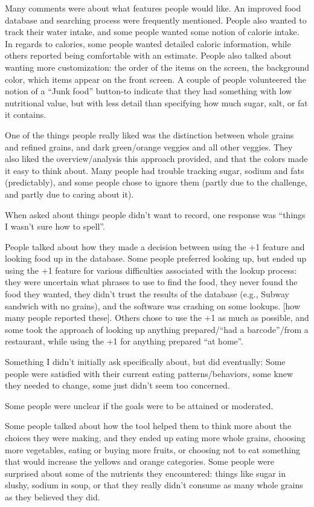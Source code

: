Many comments were about what features people would like. An improved food database and searching process were frequently mentioned. People also wanted to track their water intake, and some people wanted some notion of calorie intake. In regards to calories, some people wanted detailed caloric information, while others reported being comfortable with an estimate. People also talked about wanting more customization: the order of the items on the screen, the background color, which items appear on the front screen. A couple of people volunteered the notion of a ``Junk food'' button-to indicate that they had something with low nutritional value, but with less detail than specifying how much sugar, salt, or fat it contains. 

One of the things people really liked was the distinction between whole grains and refined grains, and dark green/orange veggies and all other veggies. They also liked the overview/analysis this approach provided, and that the colors made it easy to think about. Many people had trouble tracking sugar, sodium and fats (predictably), and some people chose to ignore them (partly due to the challenge, and partly due to caring about it). 

When asked about things people didn't want to record, one response was ``things I wasn't sure how to spell''. 

People talked about how they made a decision between using the +1 feature and looking food up in the database. Some people preferred looking up, but ended up using the +1 feature for various difficulties associated with the lookup process: they were uncertain what phrases to use to find the food, they never found the food they wanted, they didn't trust the results of the database (e.g., Subway sandwich with no grains), and the software was crashing on some lookups. [how many people reported these]. Others chose to use the +1 as much as possible, and some took the approach of looking up anything prepared/``had a barcode''/from a restaurant, while using the +1 for anything prepared ``at home''. 

Something I didn't initially ask specifically about, but did eventually: Some people were satisfied with their current eating patterns/behaviors, some knew they needed to change, some just didn't seem too concerned. 

Some people were unclear if the goals were to be attained or moderated. 

Some people talked about how the tool helped them to think more about the choices they were making, and they ended up eating more whole grains, choosing more vegetables, eating or buying more fruits, or choosing not to eat something that would increase the yellows and orange categories. Some people were surprised about some of the nutrients they encountered: things like sugar in slushy, sodium in soup, or that they really didn't consume as many whole grains as they believed they did. 


